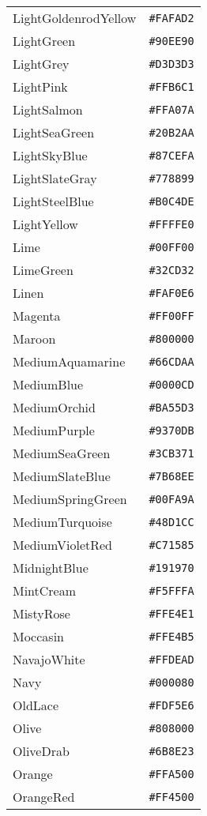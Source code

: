 \documentclass[a4paper]{article}
\begin{document}
\begin{longtable}{|l|r|}
LightGoldenrodYellow & \texttt{\#FAFAD2} \\
LightGreen & \texttt{\#90EE90} \\
LightGrey & \texttt{\#D3D3D3} \\
LightPink & \texttt{\#FFB6C1} \\
LightSalmon & \texttt{\#FFA07A} \\
LightSeaGreen & \texttt{\#20B2AA} \\
LightSkyBlue & \texttt{\#87CEFA} \\
LightSlateGray & \texttt{\#778899} \\
LightSteelBlue & \texttt{\#B0C4DE} \\
LightYellow & \texttt{\#FFFFE0} \\
Lime & \texttt{\#00FF00} \\
LimeGreen & \texttt{\#32CD32} \\
Linen & \texttt{\#FAF0E6} \\
Magenta & \texttt{\#FF00FF} \\
Maroon & \texttt{\#800000} \\
MediumAquamarine & \texttt{\#66CDAA} \\
MediumBlue & \texttt{\#0000CD} \\
MediumOrchid & \texttt{\#BA55D3} \\
MediumPurple & \texttt{\#9370DB} \\
MediumSeaGreen & \texttt{\#3CB371} \\
MediumSlateBlue & \texttt{\#7B68EE} \\
MediumSpringGreen & \texttt{\#00FA9A} \\
MediumTurquoise & \texttt{\#48D1CC} \\
MediumVioletRed & \texttt{\#C71585} \\
MidnightBlue & \texttt{\#191970} \\
MintCream & \texttt{\#F5FFFA} \\
MistyRose & \texttt{\#FFE4E1} \\
Moccasin & \texttt{\#FFE4B5} \\
NavajoWhite & \texttt{\#FFDEAD} \\
Navy & \texttt{\#000080} \\
OldLace & \texttt{\#FDF5E6} \\
Olive & \texttt{\#808000} \\
OliveDrab & \texttt{\#6B8E23} \\
Orange & \texttt{\#FFA500} \\
OrangeRed & \texttt{\#FF4500} \\

\end{longtable}
\end{document}
